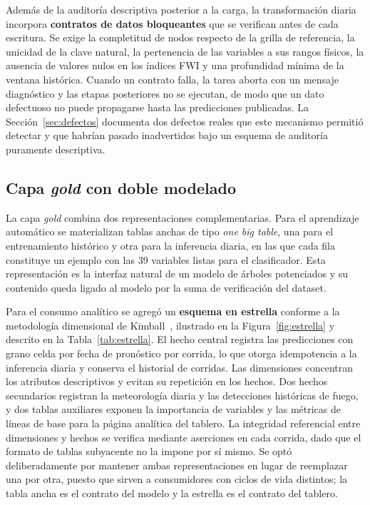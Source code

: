 \documentclass[11pt,a4paper]{article}
\begin{document}
Además de la auditoría descriptiva posterior a la carga, la transformación
diaria incorpora \textbf{contratos de datos bloqueantes} que se verifican
antes de cada escritura. Se exige la completitud de nodos respecto de la
grilla de referencia, la unicidad de la clave natural, la pertenencia de
las variables a sus rangos físicos, la ausencia de valores nulos en los
índices FWI y una profundidad mínima de la ventana histórica. Cuando un
contrato falla, la tarea aborta con un mensaje diagnóstico y las etapas
posteriores no se ejecutan, de modo que un dato defectuoso no puede
propagarse hasta las predicciones publicadas. La Sección~\ref{sec:defectos}
documenta dos defectos reales que este mecanismo permitió detectar y que
habrían pasado inadvertidos bajo un esquema de auditoría puramente
descriptiva.

\subsection{Capa \emph{gold} con doble modelado}
\label{sec:estrella}

La capa \emph{gold} combina dos representaciones complementarias. Para el
aprendizaje automático se materializan tablas anchas de tipo \emph{one big
table}, una para el entrenamiento histórico y otra para la inferencia
diaria, en las que cada fila constituye un ejemplo con las 39 variables
listas para el clasificador. Esta representación es la interfaz natural de
un modelo de árboles potenciados y su contenido queda ligado al modelo por
la suma de verificación del dataset.

Para el consumo analítico se agregó un \textbf{esquema en estrella}
conforme a la metodología dimensional de Kimball~\cite{kimball}, ilustrado
en la Figura~\ref{fig:estrella} y descrito en la Tabla~\ref{tab:estrella}.
El hecho central registra las predicciones con grano celda por fecha de
pronóstico por corrida, lo que otorga idempotencia a la inferencia diaria y
conserva el historial de corridas. Las dimensiones concentran los atributos
descriptivos y evitan su repetición en los hechos. Dos hechos secundarios
registran la meteorología diaria y las detecciones históricas de fuego, y
dos tablas auxiliares exponen la importancia de variables y las métricas de
líneas de base para la página analítica del tablero. La integridad
referencial entre dimensiones y hechos se verifica mediante aserciones en
cada corrida, dado que el formato de tablas subyacente no la impone por sí
mismo. Se optó deliberadamente por mantener ambas representaciones en lugar
de reemplazar una por otra, puesto que sirven a consumidores con ciclos de
vida distintos; la tabla ancha es el contrato del modelo y la estrella es el
contrato del tablero.
\end{document}
